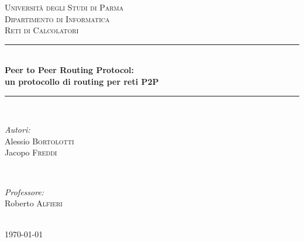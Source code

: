 \documentclass[10pt]{article} %
\begin{document}

\begin{titlepage}

\newcommand{\HRule}{\rule{\linewidth}{0.5mm}}
\center 

\textsc{\LARGE Università degli Studi di Parma}\\[1.5cm]
\textsc{\Large Dipartimento di Informatica}\\[0.5cm]
\textsc{\large Reti di Calcolatori}\\[0.5cm]

\HRule \\[0.4cm]
{ \huge \bfseries Peer to Peer Routing Protocol: \\
un protocollo di routing per reti P2P}\\[0.4cm]
\HRule \\[1.5cm]

\begin{minipage}{0.4\textwidth}
\begin{flushleft} \large
\emph{Autori:}\\
Alessio \textsc{Bortolotti} \\
Jacopo \textsc{Freddi}
\end{flushleft}
\end{minipage}
~
\begin{minipage}{0.4\textwidth}
\begin{flushright} \large
\emph{Professore:} \\
Roberto \textsc{Alfieri}
\end{flushright}
\end{minipage}\\[4cm]

{\large \today}\\[3cm]
\vfill

\end{titlepage}


\tableofcontents

\newpage
\end{document}
